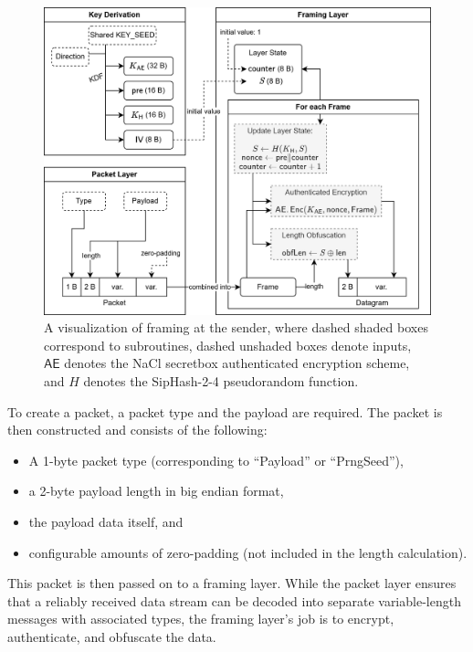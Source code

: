 \begin{figure}
    \centering
    \includegraphics[width=\linewidth]{images/packet-framing.drawio.png}
    \caption[
        A visualization of \obfsfour{} framing at the sender.
    ]{
        A visualization of \obfsfour{} framing at the sender, where dashed shaded boxes correspond to subroutines, dashed unshaded boxes denote inputs, $\mathsf{AE}$ denotes the NaCl secretbox authenticated encryption scheme, and $H$ denotes the SipHash-2-4 pseudorandom function.
    }
    \label{fig:framing}
\end{figure}

To create a packet, a packet type and the payload are required. The packet is then constructed and consists of the following:
\begin{itemize}
    \item A 1-byte packet type (corresponding to ``Payload'' or ``PrngSeed''),
    \item a 2-byte payload length in big endian format,
    \item the payload data itself, and
    \item configurable amounts of zero-padding (not included in the length calculation).
\end{itemize}

This packet is then passed on to a framing layer. While the packet layer ensures that a reliably received data stream can be decoded into separate variable-length messages with associated types, the framing layer's job is to encrypt, authenticate, and obfuscate the data.

